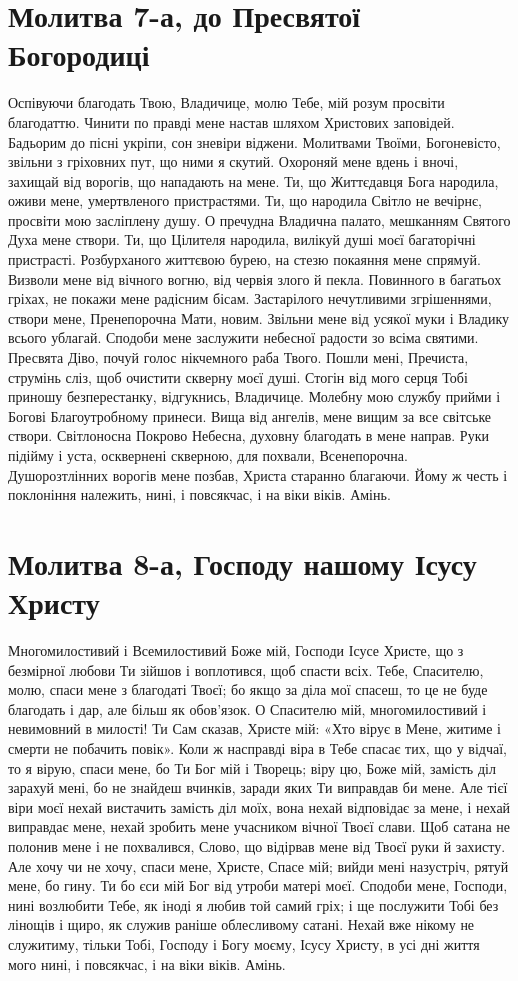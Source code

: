 \documentclass[chapters.tex]{subfiles}
\begin{document}
\section{Молитва 7-а, до Пресвятої Богородиці}
Оспівуючи благодать Твою, Владичице, молю Тебе, мій розум просвіти благодаттю. Чинити по правді мене настав шляхом Христових заповідей. Бадьорим до пісні укріпи, сон зневіри віджени. Молитвами Твоїми, Богоневісто, звільни з гріховних пут, що ними я скутий. Охороняй мене вдень і вночі, захищай від ворогів, що нападають на мене. Ти, що Життєдавця Бога народила, оживи мене, умертвленого пристрастями. Ти, що народила Світло не вечірнє, просвіти мою засліплену душу. О пречудна Владична палато, мешканням Святого Духа мене створи. Ти, що Цілителя народила, вилікуй душі моєї багаторічні пристрасті. Розбурханого життєвою бурею, на стезю покаяння мене спрямуй. Визволи мене від вічного вогню, від червія злого й пекла. Повинного в багатьох гріхах, не покажи мене радісним бісам. Застарілого нечутливими згрішеннями, створи мене, Пренепорочна Мати, новим. Звільни мене від усякої муки і Владику всього ублагай. Сподоби мене заслужити небесної радости зо всіма святими. Пресвята Діво, почуй голос нікчемного раба Твого. Пошли мені, Пречиста, струмінь сліз, щоб очистити скверну моєї душі. Стогін від мого серця Тобі приношу безперестанку, відгукнись, Владичице. Молебну мою службу прийми і Богові Благоутробному принеси. Вища від ангелів, мене вищим за все світське створи. Світлоносна Покрово Небесна, духовну благодать в мене направ. Руки підійму і уста, осквернені скверною, для похвали, Всенепорочна. Душорозтлінних ворогів мене позбав, Христа старанно благаючи. Йому ж честь і поклоніння належить, нині, і повсякчас, і на віки віків. Амінь.

\section{Молитва 8-а, Господу нашому Ісусу Христу}
Многомилостивий і Всемилостивий Боже мій, Господи Ісусе Христе, що з безмірної любови Ти зійшов і воплотився, щоб спасти всіх. Тебе, Спасителю, молю, спаси мене з благодаті Твоєї; бо якщо за діла мої спасеш, то це не буде благодать і дар, але більш як обов’язок. О Спасителю мій, многомилостивий і невимовний в милості! Ти Сам сказав, Христе мій: «Хто вірує в Мене, житиме і смерти не побачить повік». Коли ж насправді віра в Тебе спасає тих, що у відчаї, то я вірую, спаси мене, бо Ти Бог мій і Творець; віру цю, Боже мій, замість діл зарахуй мені, бо не знайдеш вчинків, заради яких Ти виправдав би мене. Але тієї віри моєї нехай вистачить замість діл моїх, вона нехай відповідає за мене, і нехай виправдає мене, нехай зробить мене учасником вічної Твоєї слави. Щоб сатана не полонив мене і не похвалився, Слово, що відірвав мене від Твоєї руки й захисту. Але хочу чи не хочу, спаси мене, Христе, Спасе мій; вийди мені назустріч, рятуй мене, бо гину. Ти бо єси мій Бог від утроби матері моєї. Сподоби мене, Господи, нині возлюбити Тебе, як іноді я любив той самий гріх; і ще послужити Тобі без лінощів і щиро, як служив раніше облесливому сатані. Нехай вже нікому не служитиму, тільки Тобі, Господу і Богу моєму, Ісусу Христу, в усі дні життя мого нині, і повсякчас, і на віки віків. Амінь.
\end{document}
